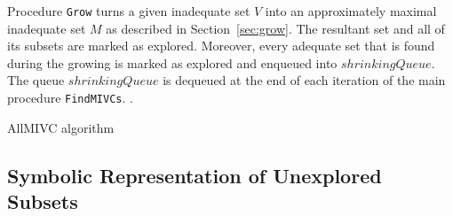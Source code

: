 Procedure \texttt{Grow} turns a given inadequate set $V$ into an approximately maximal inadequate set $M$ as described in Section~\ref{sec:grow}. The resultant set and all of its subsets are marked as explored. Moreover, every adequate set that is found during the growing is marked as explored and enqueued into $\mathit{shrinkingQueue}$. 
The queue $\mathit{shrinkingQueue}$ is dequeued at the end of each iteration of the main procedure \texttt{FindMIVCs}.  .




\begin{algorithm}[!t]

\caption{AllMIVC algorithm}
\label{alg:allmivc}
\end{algorithm}


\subsection{Symbolic Representation of Unexplored Subsets}
\label{sec:symbolic-representation}




